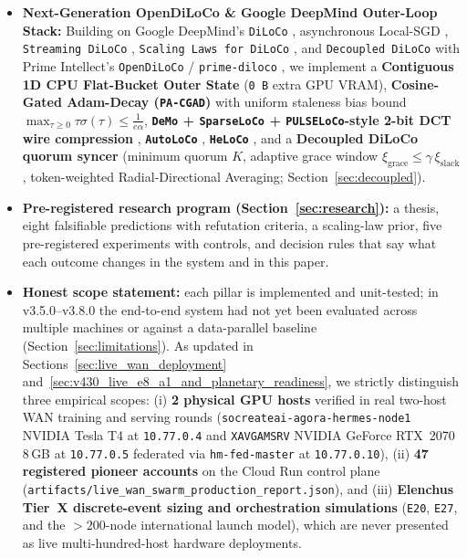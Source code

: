 \documentclass[11pt,a4paper]{article}
\begin{document}
\begin{itemize}[leftmargin=1.8em]
    \item \textbf{Next-Generation OpenDiLoCo \& Google DeepMind Outer-Loop Stack:} Building on Google DeepMind's \texttt{DiLoCo} \cite{douillard2023diloco}, asynchronous Local-SGD \cite{liu2024asynclocalsgd}, \texttt{Streaming DiLoCo} \cite{douillard2025streamingdiloco}, \texttt{Scaling Laws for DiLoCo} \cite{charles2025scalingdiloco}, and \texttt{Decoupled DiLoCo} \cite{douillard2026decoupled} with Prime Intellect's \texttt{OpenDiLoCo} / \texttt{prime-diloco} \cite{jaghouar2024opendiloco}, we implement a \textbf{Contiguous 1D CPU Flat-Bucket Outer State} (\texttt{0\,B} extra GPU VRAM), \textbf{Cosine-Gated Adam-Decay (\texttt{PA-CGAD})} \cite{shah2026cgad} with uniform staleness bias bound $\max_{\tau \ge 0} \tau \sigma(\tau) \le \frac{1}{e\alpha}$, \textbf{\texttt{DeMo} + \texttt{SparseLoCo} + \texttt{PULSELoCo}-style 2-bit DCT wire compression} \cite{peng2024demo,sarfi2025sparseloco,miahi2026pulseloco}, \textbf{\texttt{AutoLoCo}} \cite{he2026autoloco}, \textbf{\texttt{HeLoCo}} \cite{asif2026heloco}, and a \textbf{Decoupled DiLoCo quorum syncer} (minimum quorum $K$, adaptive grace window $\xi_{\text{grace}} \le \gamma\,\xi_{\text{slack}}$, token-weighted Radial-Directional Averaging; Section~\ref{sec:decoupled}).
    \item \textbf{Pre-registered research program (Section~\ref{sec:research}):} a thesis, eight falsifiable predictions with refutation criteria, a scaling-law prior, five pre-registered experiments with controls, and decision rules that say what each outcome changes in the system and in this paper.
    \item \textbf{Honest scope statement:} each pillar is implemented and unit-tested; in v3.5.0--v3.8.0 the end-to-end system had not yet been evaluated across multiple machines or against a data-parallel baseline (Section~\ref{sec:limitations}). As updated in Sections~\ref{sec:live_wan_deployment} and~\ref{sec:v430_live_e8_a1_and_planetary_readiness}, we strictly distinguish three empirical scopes: (i) \textbf{2 physical GPU hosts} verified in real two-host WAN training and serving rounds (\texttt{socreateai-agora-hermes-node1} NVIDIA Tesla T4 at \texttt{10.77.0.4} and \texttt{XAVGAMSRV} NVIDIA GeForce RTX~2070 8\,GB at \texttt{10.77.0.5} federated via \texttt{hm-fed-master} at \texttt{10.77.0.10}), (ii) \textbf{47 registered pioneer accounts} on the Cloud Run control plane (\texttt{artifacts/live\_wan\_swarm\_production\_report.json}), and (iii) \textbf{Elenchus Tier~X discrete-event sizing and orchestration simulations} (\texttt{E20}, \texttt{E27}, and the $>200$-node international launch model), which are never presented as live multi-hundred-host hardware deployments.
\end{itemize}
\end{document}
